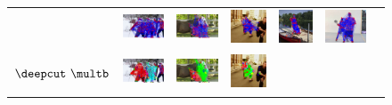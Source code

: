 \begin{figure}
  \centering
  \begin{tabular}{c c c c c c c}
    &
    \includegraphics[height=0.140\linewidth]{imgidx_0075_init_graph_mpii_multi.pdf}&
    \includegraphics[height=0.140\linewidth]{imgidx_1017_init_graph_mpii_multi.pdf}&
    \includegraphics[height=0.140\linewidth]{imgidx_1033_init_graph_mpii_multi.pdf}&
    \includegraphics[height=0.140\linewidth]{imgidx_0210_init_graph_mpii_multi.pdf}&
    \includegraphics[height=0.140\linewidth]{imgidx_0697_init_graph_mpii_multi.pdf}\\
    \begin{sideways}\bf\quad $\deepcut~\multb$\end{sideways}&        
    \includegraphics[height=0.140\linewidth]{imgidx_0075_graph_mpii_multi.pdf}&
    \includegraphics[height=0.140\linewidth]{imgidx_1017_graph_mpii_multi.pdf}&
    \includegraphics[height=0.140\linewidth]{imgidx_1033_graph_mpii_multi.pdf}&

\end{tabular}
\end{figure}
